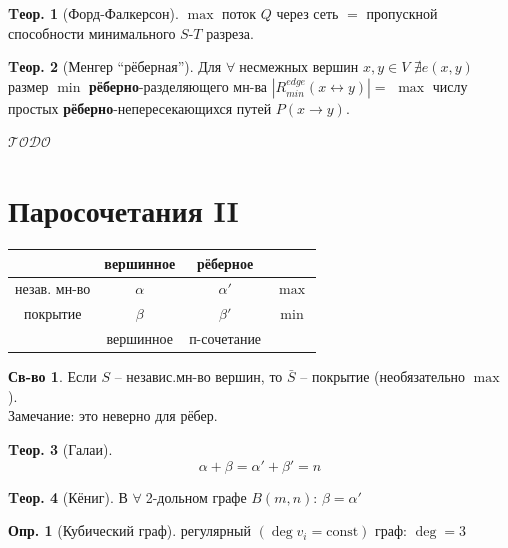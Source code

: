 \documentclass[a4paper,12pt]{article}
\numberwithin{figure}{section}
\theoremstyle{definition}
\newtheorem{definition}{Опр.}[section]
\newtheorem*{property}{Св-во}  %
\theoremstyle{definition}
\newtheorem{theorem}{Tеор.}[section]
\def\iiany{$\forall\;$}
\def\iiTODO{\guillemotleft$\mathcal{TODO}$\guillemotright\textellipsis}
\begin{document}
\begin{theorem}[Форд-Фалкерсон]
	$\max$ поток $Q$ через сеть $=$ пропускной способности минимального $S$-$T$ разреза.
\end{theorem}

\begin{theorem}[Менгер ``рёберная'']
	Для \iiany несмежных вершин $x,y \in V$ $\nexists e(x,y)$ размер $\min$ \textbf{рёберно}-разделяющего мн-ва $|R^{edge}_{min}(x \leftrightarrow y)|=$ $\max$ числу простых \textbf{рёберно}-непересекающихся путей $P(x \rightarrow y)$.
\end{theorem}

\iiTODO



\section{Паросочетания II}

\begin{center}
  \begin{tabular}{|c|c|c|c|}
	\cline{2-3}
	\multicolumn{1}{c|}{} & вершинное & рёберное     & \multicolumn{1}{|c}{} \\ \hline
	незав. мн-во          & $\alpha$  & $\alpha'$    & $\max$                \\ \hline
	покрытие              & $\beta$   & $\beta'$     & $\min$                \\ \hline
	\multicolumn{1}{c|}{} & вершинное & п-сочетание  & \multicolumn{1}{|c}{} \\ \cline{2-3}
  \end{tabular}
\end{center}

\begin{property}
	Если $S$ -- независ.мн-во вершин, то $\bar{S}$ -- покрытие (необязательно $\max$).\\
	Замечание: это неверно для рёбер.
\end{property}

\begin{theorem}[Галаи]
	\[ \alpha + \beta = \alpha' + \beta' = n \]
\end{theorem}

\begin{theorem}[Кёниг]
	В \iiany 2-дольном графе $B(m,n)$: $\beta = \alpha'$
\end{theorem}

\begin{definition}[Кубический граф]
	регулярный $(\deg v_i = \mathrm{const})$ граф: $\deg = 3$
\end{definition}
\end{document}
